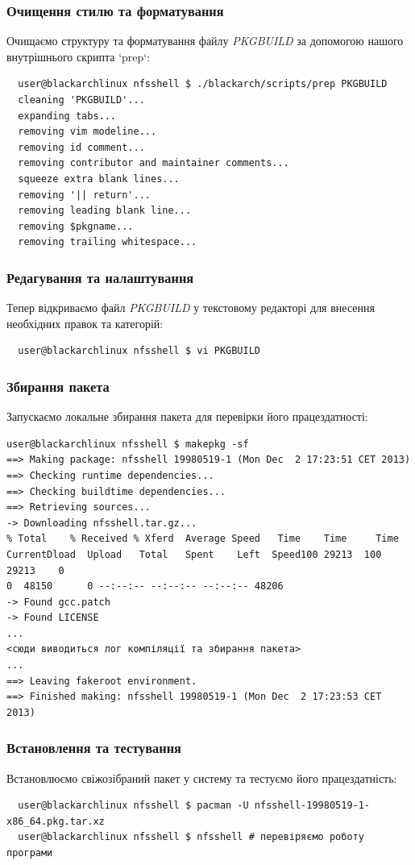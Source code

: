\documentclass[a4paper, oneside, 11pt]{book}
\begin{document}
\subsubsection{Очищення стилю та форматування}
Очищаємо структуру та форматування файлу \textit{PKGBUILD} за допомогою нашого внутрішнього скрипта `prep`:
\begin{lstlisting}
  user@blackarchlinux nfsshell $ ./blackarch/scripts/prep PKGBUILD
  cleaning 'PKGBUILD'...
  expanding tabs...
  removing vim modeline...
  removing id comment...
  removing contributor and maintainer comments...
  squeeze extra blank lines...
  removing '|| return'...
  removing leading blank line...
  removing $pkgname...
  removing trailing whitespace...
\end{lstlisting}

\subsubsection{Редагування та налаштування}
Тепер відкриваємо файл \textit{PKGBUILD} у текстовому редакторі для внесення необхідних правок та категорій:
\begin{lstlisting}
  user@blackarchlinux nfsshell $ vi PKGBUILD
\end{lstlisting}

\subsubsection{Збирання пакета}
Запускаємо локальне збирання пакета для перевірки його працездатності:
\begin{lstlisting}
user@blackarchlinux nfsshell $ makepkg -sf
==> Making package: nfsshell 19980519-1 (Mon Dec  2 17:23:51 CET 2013)
==> Checking runtime dependencies...
==> Checking buildtime dependencies...
==> Retrieving sources...
-> Downloading nfsshell.tar.gz...
% Total    % Received % Xferd  Average Speed   Time    Time     Time
CurrentDload  Upload   Total   Spent    Left  Speed100 29213  100 29213    0
0  48150      0 --:--:-- --:--:-- --:--:-- 48206
-> Found gcc.patch
-> Found LICENSE
...
<сюди виводиться лог компіляції та збирання пакета>
...
==> Leaving fakeroot environment.
==> Finished making: nfsshell 19980519-1 (Mon Dec  2 17:23:53 CET 2013)
\end{lstlisting}

\subsubsection{Встановлення та тестування}
Встановлюємо свіжозібраний пакет у систему та тестуємо його працездатність:
\begin{lstlisting}
  user@blackarchlinux nfsshell $ pacman -U nfsshell-19980519-1-x86_64.pkg.tar.xz
  user@blackarchlinux nfsshell $ nfsshell # перевіряємо роботу програми
\end{lstlisting}
\end{document}
